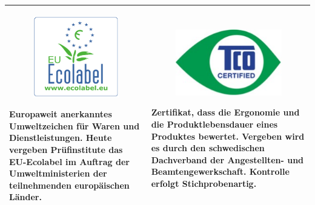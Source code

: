 \documentclass[10pt]{article}
\begin{document}
\begin{flushleft}
\begin{table}[H]
\begin{tabular}{|p{}|p{}|}
    \\\hline

    \begin{figure}
    \includegraphics{ecolabel.png}
    \end{figure}

    Europaweit anerkanntes Umweltzeichen für Waren und Dienstleistungen.
    Heute vergeben Prüfinstitute das EU-Ecolabel im Auftrag der Umweltministerien der teilnehmenden europäischen Länder.

    &

    \begin{figure}
    \includegraphics[width=\linewidth]{tco.jpg}
    \end{figure}

    Zertifikat, dass die Ergonomie und die Produktlebensdauer eines Produktes bewertet.
    Vergeben wird es durch den schwedischen Dachverband der Angestellten- und Beamtengewerkschaft.
    Kontrolle erfolgt Stichprobenartig.

    \\\hline


\end{tabular}
\end{table}
\end{flushleft}
\end{document}
